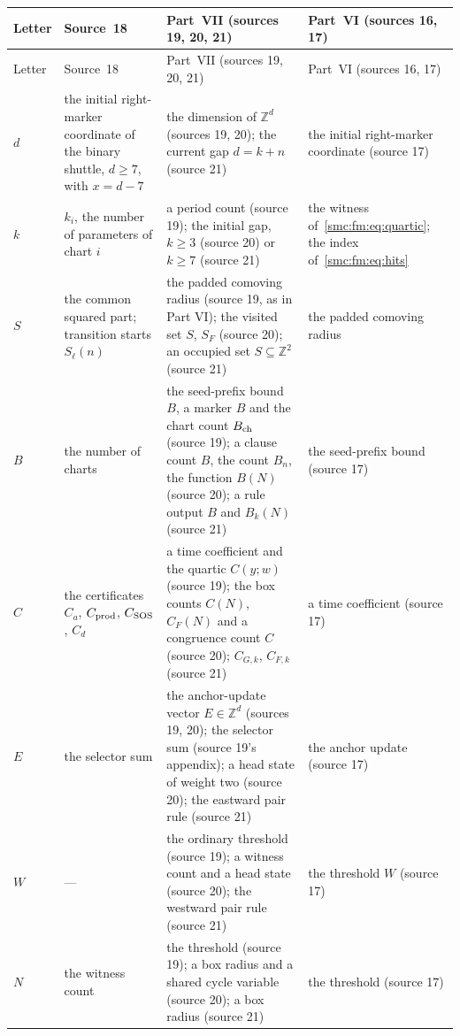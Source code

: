 \documentclass[11pt,letterpaper]{article}
\numberwithin{equation}{section}
\theoremstyle{definition}
\theoremstyle{remark}
\newcommand{\Z}{\mathbb Z}
\begin{document}
\begin{center}
\small
\renewcommand{\theHtable}{smc.zd.notation.\arabic{table}}%
\begin{longtable}{@{}L{0.06\textwidth}L{0.22\textwidth}L{0.42\textwidth}L{0.2\textwidth}@{}}
\toprule
Letter & Source~18 & Part~VII (sources 19, 20, 21) & Part~VI (sources 16, 17)\\
\midrule
\endfirsthead
\toprule
Letter & Source~18 & Part~VII (sources 19, 20, 21) & Part~VI (sources 16, 17)\\
\midrule
\endhead
$d$ & the initial right-marker coordinate of the binary shuttle, $d\ge7$, with $x=d-7$ & the dimension of $\Z^d$ (sources 19, 20); the current gap $d=k+n$ (source 21) & the initial right-marker coordinate (source 17)\\
$k$ & $k_i$, the number of parameters of chart $i$ & a period count (source 19); the initial gap, $k\ge3$ (source 20) or $k\ge7$ (source 21) & the witness of~\eqref{smc:fm:eq:quartic}; the index of~\eqref{smc:fm:eq:hits}\\
$S$ & the common squared part; transition starts $S_\ell(n)$ & the padded comoving radius (source 19, as in Part VI); the visited set $S$, $S_F$ (source 20); an occupied set $S\subseteq\Z^2$ (source 21) & the padded comoving radius\\
$B$ & the number of charts & the seed-prefix bound $B$, a marker $B$ and the chart count $B_{\rm ch}$ (source 19); a clause count $B$, the count $B_n$, the function $B(N)$ (source 20); a rule output $B$ and $B_k(N)$ (source 21) & the seed-prefix bound (source 17)\\
$C$ & the certificates $C_a$, $C_{\rm prod}$, $C_{\rm SOS}$, $C_d$ & a time coefficient and the quartic $C(y;w)$ (source 19); the box counts $C(N)$, $C_F(N)$ and a congruence count $C$ (source 20); $C_{G,k}$, $C_{F,k}$ (source 21) & a time coefficient (source 17)\\
$E$ & the selector sum & the anchor-update vector $E\in\Z^d$ (sources 19, 20); the selector sum (source 19's appendix); a head state of weight two (source 20); the eastward pair rule (source 21) & the anchor update (source 17)\\
$W$ & --- & the ordinary threshold (source 19); a witness count and a head state (source 20); the westward pair rule (source 21) & the threshold $W$ (source 17)\\
$N$ & the witness count & the threshold (source 19); a box radius and a shared cycle variable (source 20); a box radius (source 21) & the threshold (source 17)\\

\end{longtable}
\end{center}
\end{document}
